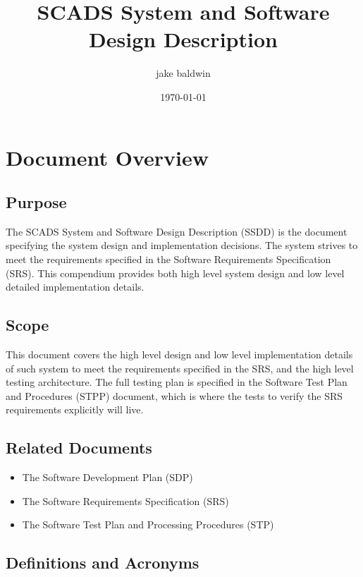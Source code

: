 \documentclass{article}
\title{SCADS System and Software Design Description}
\author{jake baldwin}
\date{\today}
\begin{document}
    \maketitle

    \section{Document Overview}\label{sec:document-overview}

        \subsection{Purpose}\label{ssec:purpose}

        The SCADS System and Software Design Description (SSDD) is the document
        specifying the system design and implementation decisions. The system
        strives to meet the requirements specified in the Software Requirements
        Specification (SRS). This compendium provides both high level system
        design and low level detailed implementation details.

        \subsection{Scope}\label{ssec:scope}

        This document covers the high level design and low level implementation
        details of such system to meet the requirements specified in the SRS,
        and the high level testing architecture. The full testing plan
        is specified in the Software Test Plan and Procedures (STPP) document,
        which is where the tests to verify the SRS requirements explicitly will
        live.

        \subsection{Related Documents}\label{ssec:related-documents}
            \begin{itemize}[label={}]
                \item The Software Development Plan (SDP)
                \item The Software Requirements Specification (SRS)
                \item The Software Test Plan and Processing Procedures (STP)
            \end{itemize}
        \subsection{Definitions and Acronyms}\label{ssec:definitions}
\end{document}

